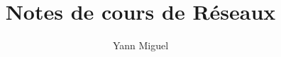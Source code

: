 \documentclass[12pt, a4paper]{article}
\title{Notes de cours de Réseaux}
\author{Yann Miguel}
\begin{document}
\ttfamily
\maketitle
\tableofcontents
\newpage






\end{document}
